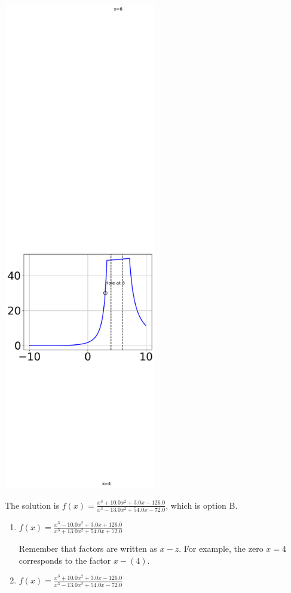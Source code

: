 \documentclass{extbook}[14pt]
\begin{document}
\begin{enumerate}
{\begin{center}
    \includegraphics[width=0.5\textwidth]{../Figures/identifyGraphOfRationalFunctionCopyC.png}
\end{center}


The solution is \( f(x)=\frac{x^{3} +10.0 x^{2} +3.0 x -126.0}{x^{3} -13.0 x^{2} +54.0 x -72.0} \), which is option B.\begin{enumerate}[label=\Alph*.]
\item \( f(x)=\frac{x^{3} -10.0 x^{2} +3.0 x + 126.0}{x^{3} +13.0 x^{2} +54.0 x + 72.0} \)

Remember that factors are written as $x-z$. For example, the zero $x=4$ corresponds to the factor $x-(4)$.
\item \( f(x)=\frac{x^{3} +10.0 x^{2} +3.0 x -126.0}{x^{3} -13.0 x^{2} +54.0 x -72.0} \)


\end{enumerate}}
\end{enumerate}
\end{document}
